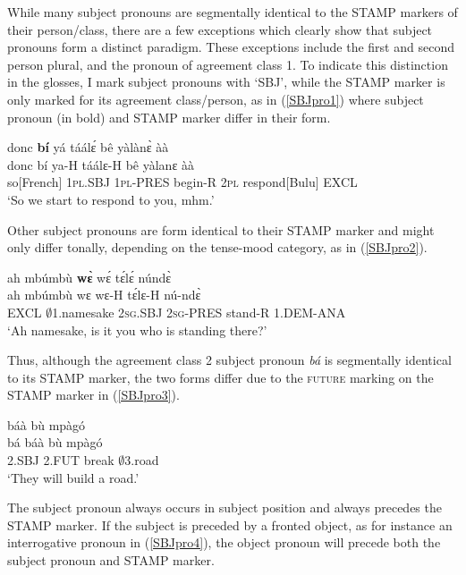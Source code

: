 While many subject pronouns are segmentally identical to the STAMP markers of their person/class, there are a few exceptions which clearly show that subject pronouns form a distinct paradigm.  These exceptions include the first and second person plural,  and the pronoun of agreement class 1. To indicate this distinction in the glosses, I mark subject pronouns with  `SBJ', while the STAMP marker is only marked for its agreement class/person, as in (\ref{SBJpro1}) where subject pronoun (in bold) and STAMP marker differ in their form.

\begin{exe} 
\ex\label{SBJpro1} 
  \glll  donc {\bfseries bí} yá táálɛ́ bê yàlànɛ̀ àà \\
        donc bí ya-H táálɛ-H bê yàlanɛ àà \\
       so[French] 1\textsc{pl}.SBJ  1\textsc{pl}-PRES begin-R 2\textsc{pl} respond[Bulu] EXCL   \\
    \trans `So we start to respond to you, mhm.'
\end{exe}

Other subject pronouns are form identical to their STAMP marker and might only differ tonally, depending on the tense-mood category, as in (\ref{SBJpro2}).

\begin{exe} 
\ex\label{SBJpro2} 
  \glll ah mbúmbù {\bfseries wɛ̀} wɛ́ tɛ́lɛ́ núndɛ̀ \\
      ah mbúmbù wɛ wɛ-H tɛ́lɛ-H nú-ndɛ̀ \\
        EXCL $\emptyset$1.namesake 2\textsc{sg}.SBJ 2\textsc{sg}-PRES stand-R 1.DEM-ANA \\
    \trans `Ah namesake, is it you who is standing there?'
\end{exe}

\noindent Thus, although the agreement class 2 subject pronoun {\itshape bá} is segmentally identical to its STAMP marker, the two forms differ due to the \textsc{future} marking on the STAMP marker in (\ref{SBJpro3}).

\begin{exe} 
\ex\label{SBJpro3}
   báà bù mpàgó \\
       bá báà bù mpàgó \\
        2.SBJ 2.FUT break $\emptyset$3.road  \\
    \trans `They will build a road.'
\end{exe}

The subject pronoun always occurs in subject position and always precedes the STAMP marker. If the subject is preceded by a fronted object, as for instance an interrogative pronoun in (\ref{SBJpro4}), the object pronoun will precede both the subject pronoun and STAMP marker.

